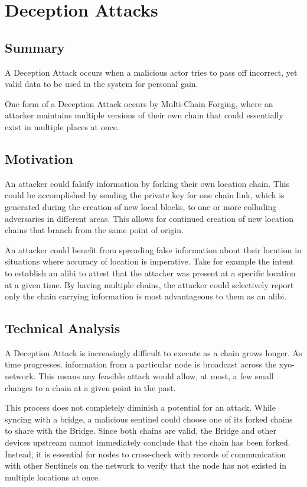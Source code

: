 \documentclass{article}
\begin{document}
\section{Deception Attacks}
\subsection{Summary}
A Deception Attack occurs when a malicious actor tries to pass off incorrect, yet valid data to be used in the system for personal gain.

One form of a Deception Attack occurs by Multi-Chain Forging, where an attacker maintains multiple versions of their own chain that could essentially exist in multiple places at once.

\subsection{Motivation}

An attacker could falsify information by forking their own location chain. This could be accomplished by sending the private key for one chain link, which is generated during the creation of new local blocks, to one or more colluding adversaries in different areas. This allows for continued creation of new location chains that branch from the same point of origin.

An attacker could benefit from spreading false information about their location in situations where accuracy of location is imperative. Take for example the intent to establish an alibi to attest that the attacker was present at a specific location at a given time. By having multiple chains, the attacker could selectively report only the chain carrying information is most advantageous to them as an alibi.

\subsection{Technical Analysis}

A Deception Attack is increasingly difficult to execute as a chain grows longer. As time progresses, information from a particular node is broadcast across the \Gls{xyo-network}. This means any feasible attack would allow, at most, a few small changes to a chain at a given point in the past.

This process does not completely diminish a potential for an attack. While syncing with a \Gls{bridge}, a malicious \Gls{sentinel} could choose one of its forked chains to share with the Bridge. Since both chains are valid, the Bridge and other  devices upstream cannot immediately conclude that the chain has been forked. Instead, it is essential for nodes to cross-check with records of communication with other Sentinels on the network to verify that the node has not existed in multiple locations at once. 
\end{document}
